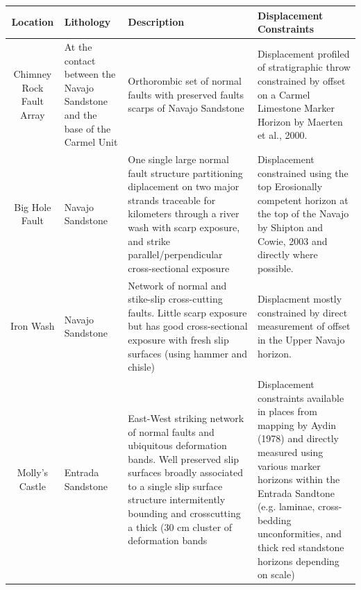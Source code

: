 \documentclass[12pt,a4paper]{article}
\begin{document}
	\afterpage %
    \clearpage%
    \thispagestyle{empty}%
    \begin{landscape}%
        \centering %
        	\begin{tabulary}{1.5\textwidth}{CLLL}

\hline
Location & Lithology & Description & Displacement Constraints \\

\hline \hline
Chimney Rock Fault Array & At the contact between the Navajo Sandstone and the base of the Carmel Unit & Orthorombic set of normal faults with preserved faults scarps of Navajo Sandstone & Displacement profiled of stratigraphic throw constrained by offset on a Carmel Limestone Marker Horizon by Maerten et al., 2000. \\

\hline
Big Hole Fault & Navajo Sandstone & One single large normal fault structure partitioning diplacement on two major strands traceable for kilometers through a river wash with scarp exposure,  and strike parallel/perpendicular cross-sectional exposure & Displacement constrained using the top Erosionally competent horizon at the top of the Navajo by Shipton and Cowie, 2003 and directly where possible. \\

\hline
Iron Wash & Navajo Sandstone & Network of normal and stike-slip cross-cutting faults. Little scarp exposure but has good cross-sectional exposure with fresh slip surfaces (using hammer and chisle) & Displacment mostly constrained by direct measurement of offset in the Upper Navajo horizon. \\

\hline
Molly's Castle & Entrada Sandstone & East-West striking network of normal faults and ubiquitous deformation bands. Well preserved slip surfaces broadly associated to a single slip surface structure intermitently bounding and crosscutting a thick (30 cm cluster of deformation bands & Displacement constraints available in places from mapping by Aydin (1978) and directly measured using various marker horizons within the Entrada Sandtone (e.g. laminae, cross-bedding unconformities, and thick red standstone horizons depending on scale) \\

\hline

			\end{tabulary}

    \end{landscape}
    \clearpage%
\end{document}

